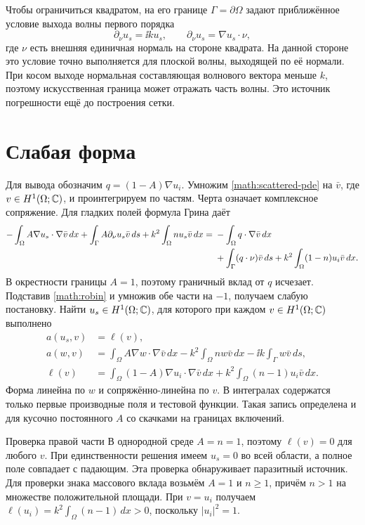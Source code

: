 Чтобы ограничиться квадратом, на его границе $\Gamma=\partial\Omega$
задают приближённое условие выхода волны первого порядка
\begin{equation}
 \partial_\nu u_s=\ii k u_s,\qquad
 \partial_\nu u_s=\nabla u_s\cdot\nu,\label{math:robin}
\end{equation}
где $\nu$ есть внешняя единичная нормаль на стороне квадрата. На данной
стороне это условие точно выполняется для плоской волны, выходящей по её
нормали.
При косом выходе нормальная составляющая волнового вектора меньше $k$,
поэтому искусственная граница может отражать часть волны. Это источник
погрешности ещё до построения сетки.

\section{Слабая форма}
Для вывода обозначим $q=(1-A)\nabla u_i$. Умножим
\eqref{math:scattered-pde} на $\bar v$, где $v\in H^1(\Omega;\mathbb{C})$,
и проинтегрируем по частям. Черта означает комплексное сопряжение.
Для гладких полей формула Грина даёт
\begin{align}
 -\int_\Omega A\nabla u_s\cdot\nabla\bar v\,dx
 +\int_\Gamma A\partial_\nu u_s\bar v\,ds
 +k^2\int_\Omega nu_s\bar v\,dx
 ={}&-\int_\Omega q\cdot\nabla\bar v\,dx\notag\\
 &+\int_\Gamma(q\cdot\nu)\bar v\,ds
 +k^2\int_\Omega(1-n)u_i\bar v\,dx.\label{math:green}
\end{align}
В окрестности границы $A=1$, поэтому граничный вклад от $q$ исчезает.
Подставив \eqref{math:robin} и умножив обе части на $-1$, получаем
слабую постановку. Найти $u_s\in H^1(\Omega;\mathbb{C})$, для которого при
каждом $v\in H^1(\Omega;\mathbb{C})$ выполнено
\begin{align}
 a(u_s,v)&=\ell(v),\label{math:weak}\\
 a(w,v)&=\int_\Omega A\nabla w\cdot\nabla\bar v\,dx
 -k^2\int_\Omega nw\bar v\,dx
 -\ii k\int_\Gamma w\bar v\,ds,\label{math:bilinear}\\
 \ell(v)&=\int_\Omega(1-A)\nabla u_i\cdot\nabla\bar v\,dx
 +k^2\int_\Omega(n-1)u_i\bar v\,dx.\label{math:rhs}
\end{align}
Форма линейна по $w$ и сопряжённо-линейна по $v$. В интегралах
содержатся только первые производные поля и тестовой функции. Такая
запись определена и для кусочно постоянного $A$ со скачками на границах
включений.

\begin{worked}{Проверка правой части}
В однородной среде $A=n=1$, поэтому $\ell(v)=0$ для любого $v$.
При единственности решения имеем $u_s=0$ во всей области, а полное поле
совпадает с падающим. Эта проверка обнаруживает паразитный источник.
Для проверки знака массового вклада возьмём $A=1$ и $n\ge1$, причём
$n>1$ на множестве положительной площади. При $v=u_i$ получаем
$\ell(u_i)=k^2\int_\Omega(n-1)\,dx>0$, поскольку $|u_i|^2=1$.
\end{worked}

